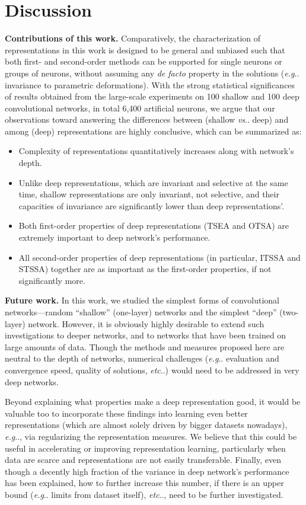 \documentclass[fleqn]{article} %
\makeatletter
\DeclareRobustCommand\onedot{\futurelet\@let@token\@onedot}
\def\@onedot{\ifx\@let@token.\else.\null\fi\xspace}
\def\eg{\emph{e.g}\onedot} \def\Eg{\emph{E.g}\onedot}
\def\etc{\emph{etc}\onedot} \def\vs{\emph{vs}\onedot}
\makeatother
\begin{document}
\section{Discussion}

{\bf Contributions of this work.}
Comparatively, the characterization of representations in this work is designed to be general and unbiased such that both first- and second-order methods can be supported for single neurons or groups of neurons, without assuming any \emph{de facto} property in the solutions (\eg invariance to parametric deformations).
With the strong statistical significances of results obtained from the large-scale experiments on 100 shallow and 100 deep convolutional networks, in total 6,400 artificial neurons, we argue that our observations toward answering the differences between (shallow \vs deep) and among (deep) representations are highly conclusive, which can be summarized as:
\begin{itemize}[leftmargin=*] %
\item Complexity of representations quantitatively increases along with network's depth.
\item Unlike deep representations, which are invariant and selective at the same time, shallow representations are only invariant, not selective, and their capacities of invariance are significantly lower than deep representations'.
\item Both first-order properties of deep representations (TSEA and OTSA) are extremely important to deep network's performance.
\item All second-order properties of deep representations (in particular, ITSSA and STSSA) together are as important as the first-order properties, if not significantly more.
\end{itemize}

{\bf Future work.}
In this work, we studied the simplest forms of convolutional networks---random ``shallow'' (one-layer) networks and the simplest ``deep'' (two-layer) network.
However, it is obviously highly desirable to extend such investigations to deeper networks, and to networks that have been trained on large amounts of data.
Though the methods and measures proposed here are neutral to the depth of networks, numerical challenges (\eg evaluation and convergence speed, quality of solutions, \etc) would need to be addressed in very deep networks.

Beyond explaining what properties make a deep representation good, it would be valuable too to incorporate these findings into learning even better representations (which are almost solely driven by bigger datasets nowadays), \eg, via regularizing the representation measures.  
We believe that this could be useful in accelerating or improving representation learning, particularly when data are scarce and representations are not easily transferable.
Finally, even though a decently high fraction of the variance in deep network's performance has been explained, how to further increase this number, if there is an upper bound (\eg limits from dataset itself), \etc, need to be further investigated.
\end{document}
